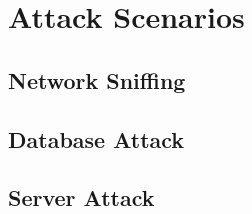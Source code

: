 \chapter{Attack Scenarios}

\section{Network Sniffing}

\section{Database Attack}

\section{Server Attack}